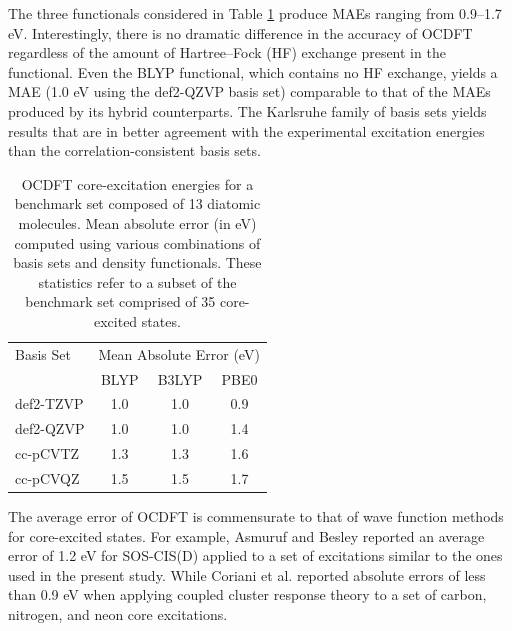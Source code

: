 \documentclass[12pt]{article}
\begin{document}
The three functionals considered in Table \ref{table:OverallPerformance} produce MAEs ranging from 0.9--1.7 eV. Interestingly, there is no dramatic difference in the accuracy of OCDFT regardless of the amount of Hartree--Fock (HF) exchange present in the functional. Even the BLYP functional, which contains no HF exchange, yields a MAE (1.0 eV using the def2-QZVP basis set) comparable to that of the MAEs produced by its hybrid counterparts.
The Karlsruhe family of basis sets yields results that are in better agreement with the experimental excitation energies than the correlation-consistent basis sets.
\begin{table}[!ht]
\small
\caption{OCDFT core-excitation energies for a benchmark set composed of 13 diatomic molecules.  Mean absolute error (in eV) computed using various combinations of basis sets and density functionals. These statistics refer to a subset of the benchmark set comprised of 35 core-excited states.}
\centering
    \begin{tabular}{lccc}
    \hline
    \hline
Basis Set & \multicolumn{3}{c}{Mean Absolute Error (eV)}  \\
& BLYP & B3LYP & PBE0\\
\hline
def2-TZVP & 1.0 & 1.0 & 0.9 \\
def2-QZVP & 1.0 & 1.0 & 1.4 \\
cc-pCVTZ & 1.3 & 1.3 & 1.6 \\
cc-pCVQZ & 1.5 & 1.5 & 1.7 \\
\hline
\hline
\end{tabular}
\label{table:OverallPerformance}
\end{table}
The average error of OCDFT is commensurate to that of wave function methods for core-excited states. For example, Asmuruf and Besley\cite{asmuruf_calculation_2008} reported an average error of 1.2 eV for SOS-CIS(D) applied to a set of excitations similar to the ones used in the present study. While Coriani et al.\cite{coriani_coupled-cluster_2012} reported absolute errors of less than 0.9 eV when applying coupled cluster response theory to a set of carbon, nitrogen, and neon core excitations. 
\end{document}
